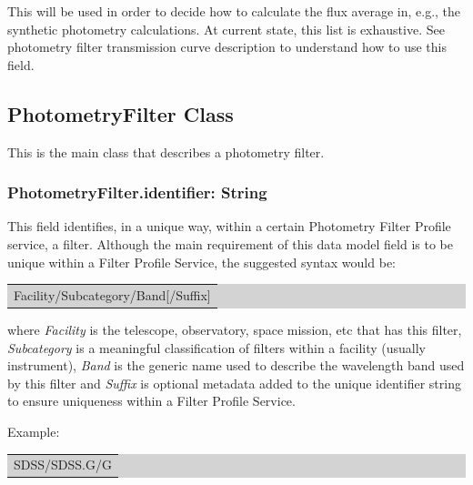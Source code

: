 \documentclass[11pt,a4paper]{ivoa}
\begin{document}

This will be used in order to decide how to calculate the flux average in, e.g., the synthetic photometry calculations. At current state, this list is exhaustive. See photometry filter transmission curve description to understand how to use this field.
\par

\subsection{PhotometryFilter Class}
This is the main class that describes a photometry filter.
\par

\subsubsection{PhotometryFilter.identifier: String}
This field identifies, in a unique way, within a certain Photometry Filter Profile service, a filter. Although the main requirement of this data model field is to be unique within a Filter Profile Service, the suggested syntax would be:
\par

\bigskip
\par
\begingroup\setlength{\fboxsep}{0pt}
\colorbox{lightgray}{%
\begin{tabular}{|p{5.53in}|}
Facility/Subcategory/Band[/Suffix]
\end{tabular}%
}\endgroup
\par
\bigskip



where \textit{Facility} is the telescope, observatory, space mission, etc that has this filter, \textit{Subcategory} is a meaningful classification of filters within a facility (usually instrument), \textit{Band} is the generic name used to describe the wavelength band used by this filter and \textit{Suffix} is optional metadata added to the unique identifier string to ensure uniqueness within a Filter Profile Service.
\par

Example: 
\par


\bigskip
\begingroup\setlength{\fboxsep}{0pt}
\colorbox{lightgray}{%
\begin{tabular}{|p{5.53in}|}
SDSS/SDSS.G/G
\end{tabular}%
}\endgroup
\par
\bigskip
\end{document}
